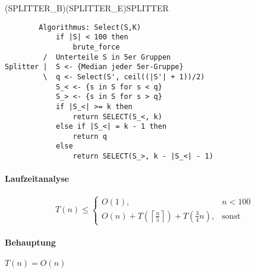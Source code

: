 \begin{description}
		\psbrace*[rot=180,nodesepA=-1.8cm,nodesepB=0.5em](SPLITTER_B)(SPLITTER_E){SPLITTER}
		\begin{verbatim}
        Algorithmus: Select(S,K)
            if |S| < 100 then
                brute_force
         /  Unterteile S in 5er Gruppen
Splitter |  S <- {Median jeder 5er-Gruppe}
         \  q <- Select(S', ceil((|S'| + 1))/2)
            S_< <- {s in S for s < q}
            S_> <- {s in S for s > q}
            if |S_<| >= k then
                return SELECT(S_<, k)
            else if |S_<| = k - 1 then
                return q
            else
                return SELECT(S_>, k - |S_<| - 1)
        \end{verbatim}
		\paragraph{Laufzeitanalyse}
		\[T(n) \leq \begin{cases}
		             O(1), & n < 100 \\
					 O(n) + T\left(\left\lceil\frac{n}{5}\right\rceil\right) + T\left(\frac{3}{4} n\right), & \text{sonst}
		            \end{cases}\]
		\paragraph{Behauptung} $T(n) = O(n)$

\end{description}
